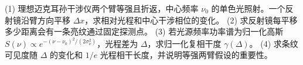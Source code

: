 (1) 理想迈克耳孙干涉仪两个臂等强且折返，中心频率 \(\nu_0\) 的单色光照射。一个反射镜沿臂方向平移 \(\Delta x\)，求相对光程和中心干涉相位的变化。
(2) 求反射镜每平移多少距离会有一条亮纹通过固定探测点。
(3) 若光源频率功率谱为归一化高斯 \(S(\nu)\propto e^{-(\nu-\nu_0)^2/(2\sigma_\nu^2)}\)，光程差为 \(\Delta\)，求归一化复相干度 \(\gamma(\Delta)\)。
(4) 求条纹可见度随 \(\Delta\) 的变化和 \(1/e\) 光程相干长度，并说明等强两臂假设的重要性。
